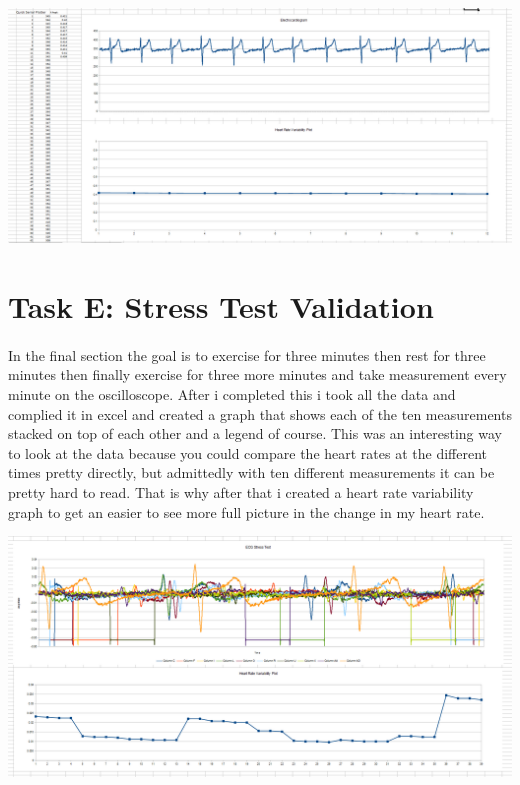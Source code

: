 \documentclass[12pt]{article}
\begin{document}
			\begin{center}
				\includegraphics[scale=0.3]{hrv.PNG}\\
			\end{center}

	\section{Task E: Stress Test Validation}
		\paragraph{}
			In the final section the goal is to exercise for three minutes then rest for three minutes then finally exercise for three more minutes and take 
			measurement every minute on the oscilloscope.  After i completed this i took all the data and complied it in excel and created a graph that shows
			each of the ten measurements stacked on top of each other and a legend of course.  This was an interesting way to look at the data because you 
			could compare the heart rates at the different times pretty directly, but admittedly with ten different measurements it can be pretty hard to read.
			That is why after that i created a heart rate variability graph to get an easier to see more full picture in the change in my heart rate.

			\begin{center}
				\includegraphics[scale=0.35]{stress.PNG}\\
			\end{center}
\end{document}
